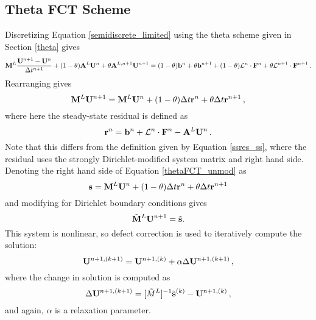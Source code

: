 \subsection{Theta FCT Scheme}
Discretizing Equation \eqref{semidiscrete_limited} using the theta scheme
given in Section \ref{theta} gives
\begin{equation}
   \mathbf{M}^L\frac{\mathbf{U}^{n+1}-\mathbf{U}^n}{\Delta t^{n+1}} + (1-\theta)\mathbf{A}^L\mathbf{U}^{n}
   + \theta\mathbf{A}^{L,n+1}\mathbf{U}^{n+1} = (1-\theta)\mathbf{b}^n + \theta\mathbf{b}^{n+1}
   + (1-\theta)\mathcal{L}^n\cdot\mathbf{F}^n + \theta\mathcal{L}^{n+1}\cdot\mathbf{F}^{n+1} \,.
\end{equation}
Rearranging gives
\begin{equation}\label{thetaFCT_unmod}
   \mathbf{M}^L\mathbf{U}^{n+1} = \mathbf{M}^L\mathbf{U}^n + (1-\theta)\Delta t\mathbf{r}^n + \theta\Delta t\mathbf{r}^{n+1} \,,
\end{equation}
where here the steady-state residual is defined as
\begin{equation}
   \mathbf{r}^n = \mathbf{b}^n + \mathcal{L}^n\cdot\mathbf{F}^n - \mathbf{A}^L\mathbf{U}^n \,.
\end{equation}
Note that this differs from the definition given by Equation \eqref{ssres_ss},
where the residual uses the strongly Dirichlet-modified system matrix and right
hand side. Denoting the right hand side of Equation \eqref{thetaFCT_unmod} as
\begin{equation}
   \mathbf{s} = \mathbf{M}^L\mathbf{U}^n + (1-\theta)\Delta t\mathbf{r}^n + \theta\Delta t\mathbf{r}^{n+1}
\end{equation}
and modifying for Dirichlet boundary conditions gives
\begin{equation}
   \tilde{\mathbf{M}}^L\mathbf{U}^{n+1} = \tilde{\mathbf{s}}.
\end{equation}
This system is nonlinear, so defect correction is used to iteratively
compute the solution:
\begin{equation}
   \mathbf{U}^{n+1,(k+1)} = \mathbf{U}^{n+1,(k)} + \alpha\Delta\mathbf{U}^{n+1,(k+1)} \,,
\end{equation}
where the change in solution is computed as
\begin{equation}
   \Delta\mathbf{U}^{n+1,(k+1)} = [\tilde{M}^L]^{-1}\tilde{\mathbf{s}}^{(k)} - \mathbf{U}^{n+1,(k)} \,,
\end{equation}
and again, $\alpha$ is a relaxation parameter.


